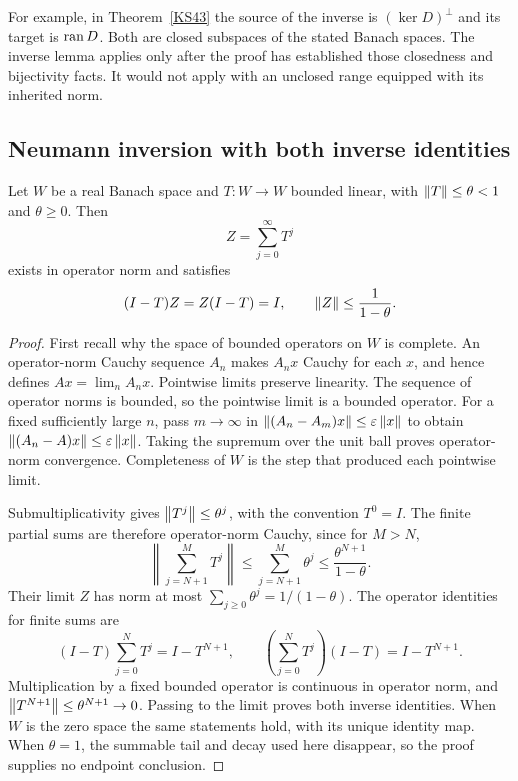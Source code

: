 For example, in Theorem~\ref{KS43} the source of the inverse is \((\ker D)^\perp\) and its target is \(\operatorname{ran} D\). Both are closed subspaces of the stated Banach spaces. The inverse lemma applies only after the proof has established those closedness and bijectivity facts. It would not apply with an unclosed range equipped with its inherited norm.

\subsection{Neumann inversion with both inverse identities}
\begin{lemma}\label{lem:neumann-tool}
Let \(W\) be a real Banach space and \(T:W\to W\) bounded linear, with \(\left\lVert T\right\rVert\le\theta<1\) and \(\theta\ge0\). Then
\[
 Z=\sum_{j=0}^{\infty}T^j
\]
exists in operator norm and satisfies
\[
 (I-T)Z=Z(I-T)=I,\qquad \left\lVert Z\right\rVert\le\frac1{1-\theta}.
\]
\end{lemma}
\begin{proof}
First recall why the space of bounded operators on \(W\) is complete. An operator-norm Cauchy sequence \(A_n\) makes \(A_nx\) Cauchy for each \(x\), and hence defines \(Ax=\lim_nA_nx\). Pointwise limits preserve linearity. The sequence of operator norms is bounded, so the pointwise limit is a bounded operator. For a fixed sufficiently large \(n\), pass \(m\to\infty\) in \(\left\lVert(A_n-A_m)x\right\rVert\le\varepsilon\left\lVert x\right\rVert\) to obtain \(\left\lVert(A_n-A)x\right\rVert\le\varepsilon\left\lVert x\right\rVert\). Taking the supremum over the unit ball proves operator-norm convergence. Completeness of \(W\) is the step that produced each pointwise limit.

Submultiplicativity gives \(\left\lVert T^j\right\rVert\le\theta^j\), with the convention \(T^0=I\). The finite partial sums are therefore operator-norm Cauchy, since for \(M>N\),
\[
 \left\|\sum_{j=N+1}^{M}T^j\right\|
 \le\sum_{j=N+1}^{M}\theta^j\le\frac{\theta^{N+1}}{1-\theta}.
\]
Their limit \(Z\) has norm at most \(\sum_{j\ge0}\theta^j=1/(1-\theta)\). The operator identities for finite sums are
\[
 (I-T)\sum_{j=0}^{N}T^j=I-T^{N+1},\qquad
 \left(\sum_{j=0}^{N}T^j\right)(I-T)=I-T^{N+1}.
\]
Multiplication by a fixed bounded operator is continuous in operator norm, and \(\left\lVert T^{N+1}\right\rVert\le\theta^{N+1}\to0\). Passing to the limit proves both inverse identities. When \(W\) is the zero space the same statements hold, with its unique identity map. When \(\theta=1\), the summable tail and decay used here disappear, so the proof supplies no endpoint conclusion.
\end{proof}

